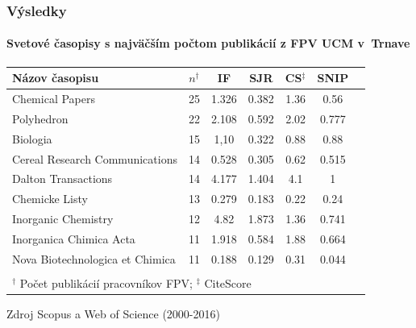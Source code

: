 \documentclass{beamer}
\begin{document}
\begin{frame}
  \frametitle{Výsledky}
  \framesubtitle{Svetové časopisy s najväčším počtom publikácií z FPV UCM v~Trnave}
  \vspace{-0.5em}

  {\small
  \begin{tabular}{lcccccc}
    \toprule\noalign{\vspace{.3ex}}
     Názov časopisu                                                                   & $n^\dagger$ & IF & SJR  & CS$^\ddagger$ & SNIP           \\[0.3ex]
   \midrule\noalign{\vspace{.5ex}}

    Chemical Papers                                                                    & 25     & 1.326   & 0.382 &  1.36      & 0.56                  \\
    Polyhedron                                                                         & 22     & 2.108   & 0.592 &  2.02      & 0.777                 \\
    Biologia                                                                           & 15     & 1,10    & 0.322 &  0.88      & 0.88                  \\
    Cereal Research Communications                                                     & 14     & 0.528   & 0.305 &  0.62      & 0.515                 \\
    Dalton Transactions                                                                & 14     & 4.177   & 1.404 &  4.1       & 1                     \\[1ex]
    Chemicke Listy                                                                     & 13     & 0.279   & 0.183 &  0.22      & 0.24                  \\
    Inorganic Chemistry                                                                & 12     & 4.82    & 1.873 &  1.36      & 0.741                 \\
    Inorganica Chimica Acta                                                            & 11     & 1.918   & 0.584 &  1.88      & 0.664                 \\
    Nova Biotechnologica et Chimica                                                    & 11     & 0.188   & 0.129 &  0.31      & 0.044                 \\
    \bottomrule \\ [-2ex]
    \multicolumn{7}{l}{\footnotesize $^\dagger$ Počet publikácií pracovníkov FPV; $^\ddagger$ CiteScore} \\
     
  \end{tabular}}

  Zdroj Scopus a Web of Science (2000-2016)

\end{frame}
\end{document}
